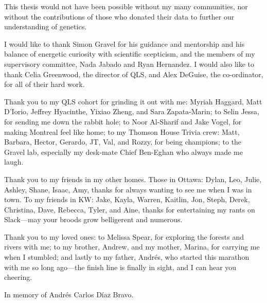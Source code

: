 This thesis would not have been possible without my many communities, nor without the contributions of those who donated their data to further our understanding of genetics.

I would like to thank Simon Gravel for his guidance and mentorship and his balance of energetic curiosity with scientific scepticism, and the members of my supervisory committee, Nada Jabado and Ryan Hernandez. I would also like to thank Celia Greenwood, the director of QLS, and Alex DeGuise, the co-ordinator, for all of their hard work.

Thank you to my QLS cohort for grinding it out with me: Myriah Haggard, Matt D'Iorio, Jeffrey Hyacinthe, Yixiao Zheng, and Sara Zapata-Marin; to Selin Jessa, for sending me down the rabbit hole; to Noor Al-Sharif and Jake Vogel, for making Montreal feel like home; to my Thomson House Trivia crew: Matt, Barbara, Hector, Gerardo, JT, Val, and Rozzy, for being champions; to the Gravel lab, especially my desk-mate Chief Ben-Eghan who always made me laugh.

Thank you to my friends in my other homes. Those in Ottawa: Dylan, Leo, Julie, Ashley, Shane, Isaac, Amy, thanks for always wanting to see me when I was in town. To my friends in KW: Jake, Kayla, Warren, Kaitlin, Jon, Steph, Derek, Christina, Dave, Rebecca, Tyler, and Aine, thanks for entertaining my rants on Slack---may your broods grow belligerent and numerous.

Thank you to my loved ones: to Melissa Spear, for exploring the forests and rivers with me; to my brother, Andrew, and my mother, Marina, for carrying me when I stumbled; and lastly to my father, Andr\'{e}s, who started this marathon with me so long ago---the finish line is finally in sight, and I can hear you cheering.

\pagebreak
\hspace{0pt}
\vfill

\begin{center}
In memory of Andr\'{e}s Carlos D\'{i}az Bravo.
\end{center}

\vfill
\hspace{0pt}
\pagebreak

